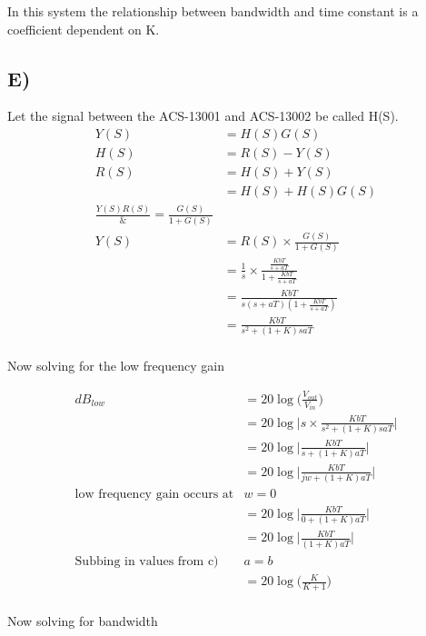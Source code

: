 \documentclass{report}
\begin{document}
In this system the relationship between bandwidth and time constant is a coefficient dependent on K.

\subsection*{E)} %
\label{sub:e_}
Let the signal between the ACS-13001 and ACS-13002 be called H(S).
\begin{align*}
    Y(S) &= H(S)G(S)\\
    H(S) &= R(S)-Y(S)\\
    R(S) &= H(S) + Y(S)\\
        &= H(S) + H(S)G(S)\\
    \frac{Y(S){R(S)}} &= \frac{G(S)}{1+G(S)}\\
    Y(S) &= R(S) \times \frac{G(S)}{1+G(S)}\\
        &= \frac{1}{s} \times \frac{\frac{KbT}{s + aT}}{1 + \frac{KbT}{s + aT}}\\
        &= \frac{KbT}{s(s+aT)(1 + \frac{KbT}{s + aT})}\\
        &= \frac{KbT}{s^2 + (1+K)saT}\\
\end{align*}

Now solving for the low frequency gain

\begin{align*}
    dB_{low} &= 20 \log\bigg(\frac{V_{out}}{V_{in}}\bigg)\\
        &= 20 \log\bigg|s \times \frac{KbT}{s^2 + (1+K)saT} \bigg|\\
        &= 20 \log\bigg| \frac{KbT}{s + (1+K)aT} \bigg|\\
        &= 20 \log\bigg| \frac{KbT}{jw + (1+K)aT} \bigg|\\
        \text{low frequency gain occurs at} & w=0\\
        &= 20 \log\bigg| \frac{KbT}{0+ (1+K)aT} \bigg|\\
        &= 20 \log\bigg| \frac{KbT}{(1+K)aT} \bigg|\\
        \text{Subbing in values from c) } & a=b\\
        &= 20 \log\bigg(\frac{K}{K+1}\bigg)\\
\end{align*}

Now solving for bandwidth
\end{document}
